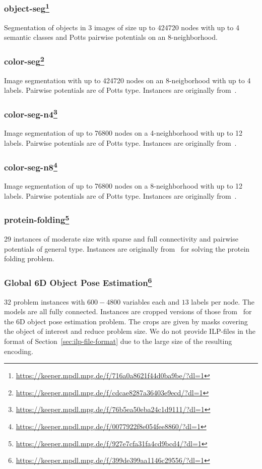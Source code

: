 \subsubsection[object-seg]{object-seg\footnote{\url{https://keeper.mpdl.mpg.de/f/716a0a8621f44d0ba9be/?dl=1}}}
Segmentation of objects in 3 images of size up to 424720 nodes with up to 4 semantic classes and Potts pairwise potentials on an 8-neighborhood.

\subsubsection[color-seg]{color-seg\footnote{\url{https://keeper.mpdl.mpg.de/f/cdcae8287a36403e9ecd/?dl=1}}}
Image segmentation with up to 424720 nodes on an 8-neigborhood with up to 4 labels. 
Pairwise potentials are of Potts type.
Instances are originally from~\cite{alahari2009dynamic}.

\subsubsection[color-seg-n4]{color-seg-n4\footnote{\url{https://keeper.mpdl.mpg.de/f/76b5ea50eba24c1d9111/?dl=1}}}
Image segmentation of up to 76800 nodes on a 4-neighborhood with up to 12 labels. 
Pairwise potentials are of Potts type.
Instances are originally from~\cite{lellmann2011continuous}.

\subsubsection[color-seg-n8]{color-seg-n8\footnote{\url{https://keeper.mpdl.mpg.de/f/0077922f8e054fee8860/?dl=1}}}
Image segmentation of up to 76800 nodes on a 8-neighborhood with up to 12 labels. 
Pairwise potentials are of Potts type.
Instances are originally from~\cite{lellmann2011continuous}.

\subsubsection[protein-folding]{protein-folding\footnote{\url{https://keeper.mpdl.mpg.de/f/927e7cfa31fa4cd9bcd4/?dl=1}}}
29 instances of moderate size with sparse and full connectivity and pairwise potentials of general type.
Instances are originally from~\cite{jaimovich2006towards,elidan2011probabilistic} for solving the protein folding problem.

\subsubsection[Global 6D Object Pose Estimation]{Global 6D Object Pose Estimation\footnote{\url{https://keeper.mpdl.mpg.de/f/399de399aa1146c29556/?dl=1}}}
$32$ problem instances with $600-4800$ variables each and $13$ labels per node. The models are all fully connected.
Instances are cropped versions of those from~\cite{michel2017global} for the 6D object pose estimation problem.
The crops are given by masks covering the object of interest and reduce problem size.
We do not provide ILP-files in the format of Section~\ref{sec:ilp-file-format} due to the large size of the resulting encoding.


